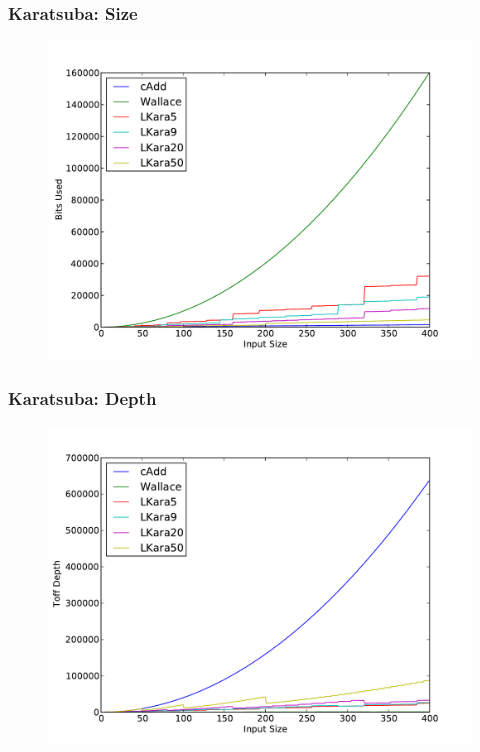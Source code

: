 \documentclass[utf8]{beamer}
\begin{document}
\begin{frame}
  \frametitle{Karatsuba: Size}
  \begin{figure} 
    \includegraphics[width=\linewidth]{diagrams/karaSize}
  \end{figure}
\end{frame}

\begin{frame}
  \frametitle{Karatsuba: Depth}
  \begin{figure} 
    \includegraphics[width=\linewidth]{diagrams/karaDepth}
  \end{figure}
\end{frame}
\end{document}
